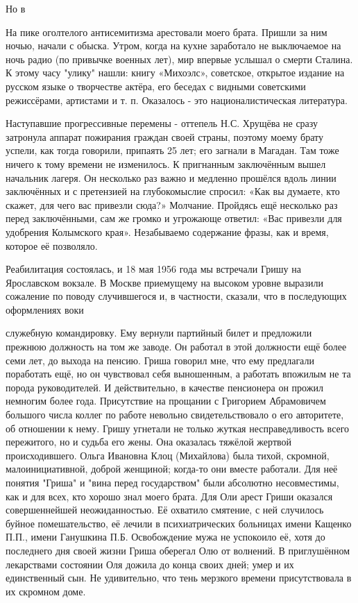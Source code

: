 Но в

\label{169-1}
На пике оголтелого антисемитизма арестовали моего брата. Пришли за ним ночью, начали с обыска. Утром, когда на кухне заработало не выключаемое на ночь радио (по привычке военных лет), мир впервые услышал о смерти Сталина. К этому часу "улику" нашли: книгу «Михоэлс», советское, открытое издание на русском языке о творчестве актёра, его беседах с видными советскими режиссёрами, артистами и т. п. Оказалось - это националистическая литература.

Наступавшие прогрессивные перемены - оттепель Н.С. Хрущёва не сразу затронула аппарат пожирания граждан своей страны, поэтому моему брату успели, как тогда говорили, припаять 25 лет; его загнали в Магадан. Там тоже ничего к тому времени не изменилось. К пригнанным заключённым вышел начальник лагеря. Он несколько раз важно и медленно прошёлся вдоль линии заключённых и с претензией на глубокомыслие спросил: «Как вы думаете, кто скажет, для чего вас привезли сюда?» Молчание. Пройдясь ещё несколько раз перед заключёнными, сам же громко и угрожающе ответил: «Вас привезли для удобрения Колымского края». Незабываемо содержание фразы, как и время, которое её позволяло.

Реабилитация состоялась, и 18 мая 1956 года мы встречали Гришу на Ярославском вокзале. В Москве приемущему на высоком уровне выразили сожаление по поводу случившегося и, в частности, сказали, что в последующих оформлениях воки

\label{170-1}
служебную командировку. Ему вернули партийный билет и предложили прежнюю должность на том же заводе. Он работал в этой должности ещё более семи лет, до выхода на пенсию. Гриша говорил мне, что ему предлагали поработать ещё, но он чувствовал себя выношенным, а работать впожилым не та порода руководителей. И действительно, в качестве пенсионера он прожил немногим более года. Присутствие на прощании с Григорием Абрамовичем большого числа коллег по работе невольно свидетельствовало о его авторитете, об отношении к нему. Гришу угнетали не только жуткая несправедливость всего пережитого, но и судьба его жены. Она оказалась тяжёлой жертвой происходившего. Ольга Ивановна Клоц (Михайлова) была тихой, скромной, малоинициативной, доброй женщиной; когда-то они вместе работали. Для неё понятия "Гриша" и "вина перед государством" были абсолютно несовместимы, как и для всех, кто хорошо знал моего брата. Для Оли арест Гриши оказался совершеннейшей неожиданностью. Её охватило смятение, с ней случилось буйное помешательство, её лечили в психиатрических больницах имени Кащенко П.П., имени Ганушкина П.Б. Освобождение мужа не успокоило её, хотя до последнего дня своей жизни Гриша оберегал Олю от волнений. В приглушённом лекарствами состоянии Оля дожила до конца своих дней; умер и их единственный сын. Не удивительно, что тень мерзкого времени присутствовала в их скромном доме.

